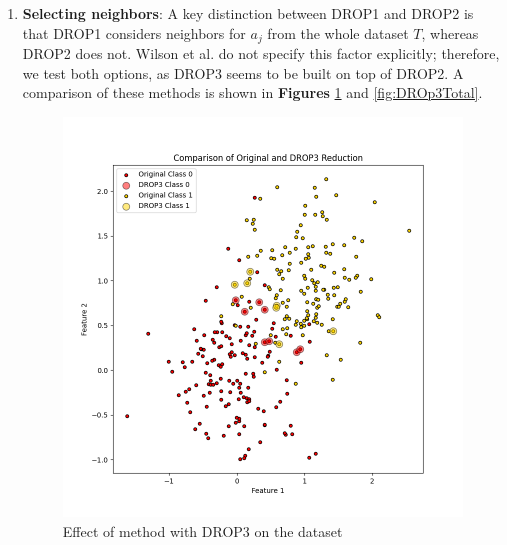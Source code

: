 \begin{enumerate}
	\item \textbf{Selecting neighbors}: A key distinction between DROP1 and DROP2 is that DROP1 considers neighbors for $ a_j $ from the whole dataset $ T $, whereas DROP2 does not. Wilson et al. \cite{wilson1972asymptotic} do not specify this factor explicitly; therefore, we test both options, as DROP3 seems to be built on top of DROP2. A comparison of these methods is shown in \textbf{Figures} \ref{fig:DROP3Reduciendo} and \ref{fig:DROp3Total}.
	
	\begin{figure}[ht]
		\centering
		\begin{minipage}{0.45\textwidth}
			\centering
			\includegraphics[width=\textwidth]{figures/DROP3Reduciendo} %
			\caption{Effect of method with DROP3 on the dataset}
			\label{fig:DROP3Reduciendo}
		\end{minipage}\hfill
		\begin{minipage}{0.45\textwidth}
			\centering

\end{minipage}
\end{figure}
\end{enumerate}
